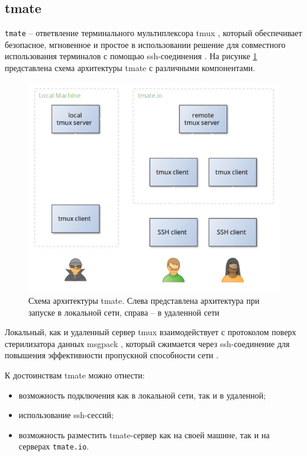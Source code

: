\subsection{tmate}

\texttt{tmate} \cite{tmate} -- ответвление терминального мультиплексора tmux \cite{tmux}, который обеспечивает безопасное, мгновенное и простое в использовании решение для совместного использования терминалов с помощью ssh-соединения \cite{ssh}. На рисунке \ref{fig:tmux} представлена схема архитектуры tmate с различными компонентами.

\begin{center}
	\begin{figure}[H]
		\begin{center}
			\includegraphics[scale=0.32]{img/tmate.png}
		\end{center}
		\caption{\label{fig:tmux} Схема архитектуры tmate. Слева представлена архитектура при запуске в локальной сети, справа -- в удаленной сети}
	\end{figure}
\end{center}

Локальный, как и удаленный сервер tmux взаимодействует с протоколом поверх стерилизатора данных msgpack \cite{msgpack}, который сжимается через ssh-соединение для повышения эффективности пропускной способности сети \cite{tmate}.

К достоинствам tmate можно отнести:
\begin{itemize}
	\item возможность подключения как в локальной сети, так и в удаленной;
	\item использование ssh-сессий;
	\item возможность разместить tmate-сервер как на своей машине, так и на серверах \texttt{tmate.io}.
\end{itemize}

